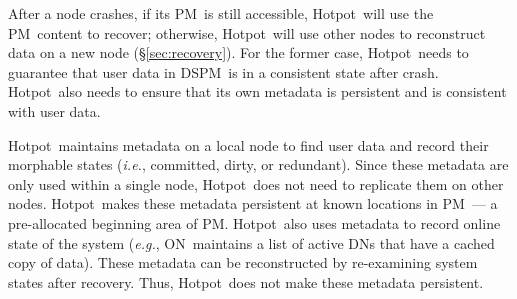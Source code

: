 \documentclass[sigconf]{acmart}
\newcommand{\eg}{\textit{e.g.}}
\newcommand{\ie}{\textit{i.e.}}
\newcommand{\dsnvm}{DSPM}
\newcommand{\nvm}{PM}
\newcommand{\hotpot}{Hotpot}
\newcommand{\on}{ON}
\newcommand{\dn}{DN}
\newcommand{\dirty}{dirty}
\newcommand{\committed}{committed}
\newcommand{\redundant}{redundant}
\begin{document}
{After a node crashes, if its \nvm\ is still accessible, \hotpot\ will use the \nvm\ content to recover;
otherwise, \hotpot\ will use other nodes to reconstruct data on a new node (\S\ref{sec:recovery}).
For the former case, \hotpot\ needs to guarantee that user data in \dsnvm\ is in a consistent state after crash.
\hotpot\ also needs to ensure that its own metadata is persistent and is consistent with user data.

\hotpot\ maintains metadata on a local node to find user data and record their morphable states (\ie, \committed, \dirty, or \redundant).
Since these metadata are only used within a single node, \hotpot\ does not need to replicate them on other nodes.
\hotpot\ makes these metadata persistent at known locations in \nvm\ ---
a pre-allocated beginning area of \nvm.
\hotpot\ also uses metadata to record online state of the system (\eg, \on\ maintains a list of active \dn{}s that have a cached copy of data).
These metadata can be reconstructed by re-examining system states after recovery.
Thus, \hotpot\ does not make these metadata persistent.

}
\end{document}
